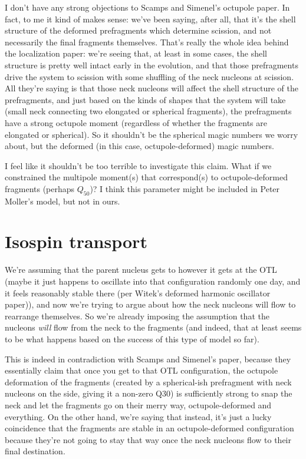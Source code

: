 I don't have any strong objections to Scamps and Simenel's octupole paper. In fact, to me it kind of makes sense: we've been saying, after all, that it's the shell structure of the deformed prefragments which determine scission, and not necessarily the final fragments themselves. That's really the whole idea behind the localization paper: we're seeing that, at least in some cases, the shell structure is pretty well intact early in the evolution, and that those prefragments drive the system to scission with some shuffling of the neck nucleons at scission. All they're saying is that those neck nucleons will affect the shell structure of the prefragments, and just based on the kinds of shapes that the system will take (small neck connecting two elongated or spherical fragments), the prefragments have a strong octupole moment (regardless of whether the fragments are elongated or spherical). So it shouldn't be the spherical magic numbers we worry about, but the deformed (in this case, octupole-deformed) magic numbers.

I feel like it shouldn't be too terrible to investigate this claim. What if we constrained the multipole moment(s) that correspond(s) to octupole-deformed fragments (perhaps $Q_{50}$)? I think this parameter might be included in Peter Moller's model, but not in ours.


\section{Isospin transport}
We're assuming that the parent nucleus gets to however it gets at the OTL (maybe it just happens to oscillate into that configuration randomly one day, and it feels reasonably stable there (per Witek's deformed harmonic oscillator paper)), and now we're trying to argue about how the neck nucleons will flow to rearrange themselves. So we're already imposing the assumption that the nucleons \textit{will} flow from the neck to the fragments (and indeed, that at least seems to be what happens based on the success of this type of model so far).

This is indeed in contradiction with Scamps and Simenel's paper, because they essentially claim that once you get to that OTL configuration, the octupole deformation of the fragments (created by a spherical-ish prefragment with neck nucleons on the side, giving it a non-zero Q30) is sufficiently strong to snap the neck and let the fragments go on their merry way, octupole-deformed and everything. On the other hand, we're saying that instead, it's just a lucky coincidence that the fragments are stable in an octupole-deformed configuration because they're not going to stay that way once the neck nucleons flow to their final destination.

